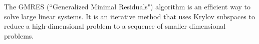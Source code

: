 \label{lab:GMRES}

The GMRES (``Generalized Minimal Residuals") algorithm is an efficient way to solve large linear systems.
It is an iterative method that uses Krylov subspaces to reduce a high-dimensional problem to a sequence of smaller dimensional
problems.

